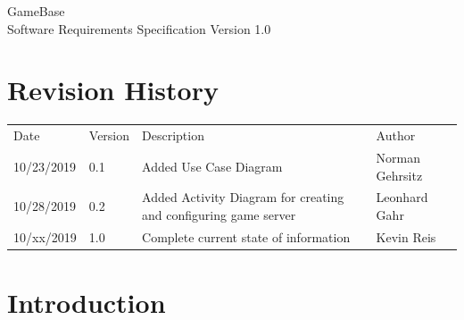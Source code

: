 \documentclass[a4paper,12pt,chapterprefix=false,bibliography=totoc,listof=totoc,]{scrreprt}
\begin{document}
	
\begin{flushright}
GameBase
\\
Software Requirements Specification
\bigbreak
Version 1.0
\end{flushright}
\chapter*{Revision History}
\begin{table}[H]
	\centering
	\everyrow{\hline}
	\begin{tabu} to \textwidth {|X[c]|X[c]|X[c]|X[c]|}
		Date & Version & Description & Author\\
		10/23/2019 & 0.1 & Added Use Case Diagram & Norman Gehrsitz \\
		10/28/2019 & 0.2 & Added Activity Diagram for creating and configuring game server & Leonhard Gahr \\
		10/xx/2019 & 1.0 & Complete current state of information & Kevin Reis \\
	\end{tabu}
	\label{tab:rev-hist}
\end{table}

\tableofcontents

\chapter{Introduction}


\end{document}
